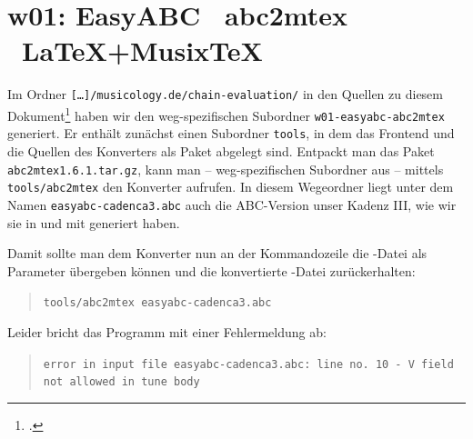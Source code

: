 %
%
%

\section{w01: Easy\-ABC \ra\ abc2mtex \ra\ \LaTeX+Musix\TeX}\label{w01}

Im Ordner \texttt{[\ldots]/musicology.de/chain-evaluation/} in den Quellen zu
diesem Dokument\footcite[vgl.][\nopage wp]{Reincke2019a} haben wir
den weg-spezifischen Subordner \texttt{w01-easyabc-abc2mtex} generiert.
Er enthält zunächst einen Subordner \texttt{tools}, in dem das Frontend
 und die Quellen des Konverters  als Paket abgelegt
sind. Entpackt man das Paket \texttt{abc2mtex1.6.1.tar.gz}, kann man --
weg-spezifischen Subordner aus -- mittels \texttt{tools/abc2mtex} den Konverter
aufrufen. In diesem Wegeordner liegt unter dem Namen
\texttt{easyabc-cadenca3.abc} auch die ABC-Version unser Kadenz III, wie wir sie
in und mit  generiert haben.

Damit sollte man dem Konverter  nun an der Kommandozeile die
-Datei als Parameter übergeben können und die konvertierte
-Datei zurückerhalten:

\begin{quote}\texttt{tools/abc2mtex easyabc-cadenca3.abc}\end{quote}

Leider bricht das Programm mit einer Fehlermeldung ab:

\begin{quote}\texttt{error in input file easyabc-cadenca3.abc: line no. 10 - V
field not allowed in tune body }\end{quote}

